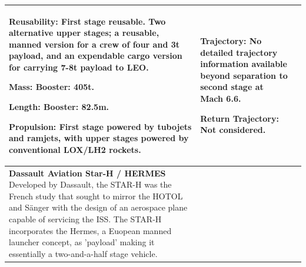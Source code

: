 {\begin{landscape}
\begin{xltabular}{\linewidth}{|X|X|X|}
	\textbf{Reusability:} First stage reusable. Two alternative upper stages; a reusable, manned version for a crew of four and 3t payload, and an expendable cargo version for carrying 7-8t payload to LEO. 
	
	\textbf{Mass:} Booster: 405t. 
	
	\textbf{Length:} Booster: 82.5m.
	
	\textbf{Propulsion:} First stage powered by tubojets and ramjets, with upper stages powered by conventional LOX/LH2 rockets. 
	
	&\small
	\textbf{Trajectory:} No detailed trajectory information available beyond separation to second stage at Mach 6.6. 
	
	\textbf{Return Trajectory:} Not considered. 
	\\
	\hline \small 
	\textbf{Dassault Aviation Star-H / HERMES} \cite{Aberleen}\newline\newline
Developed by Dassault, the STAR-H was the French study that sought to mirror the HOTOL and S{\"a}nger with the design of an aerospace plane capable of servicing the ISS. The STAR-H incorporates the Hermes, a Euopean manned launcher concept, as 'payload' making it essentially a two-and-a-half stage vehicle. 
	
	
	&\small
{}


\end{xltabular}
\end{landscape}}
